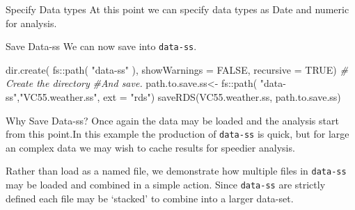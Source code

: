\documentclass[
  ignorenonframetext,
]{beamer}
\newenvironment{Shaded}{\begin{snugshade}}{\end{snugshade}}
\newcommand{\AttributeTok}[1]{\textcolor[rgb]{0.77,0.63,0.00}{#1}}
\newcommand{\CommentTok}[1]{\textcolor[rgb]{0.56,0.35,0.01}{\textit{#1}}}
\newcommand{\ConstantTok}[1]{\textcolor[rgb]{0.00,0.00,0.00}{#1}}
\newcommand{\FunctionTok}[1]{\textcolor[rgb]{0.00,0.00,0.00}{#1}}
\newcommand{\NormalTok}[1]{#1}
\newcommand{\OtherTok}[1]{\textcolor[rgb]{0.56,0.35,0.01}{#1}}
\newcommand{\SpecialCharTok}[1]{\textcolor[rgb]{0.00,0.00,0.00}{#1}}
\newcommand{\StringTok}[1]{\textcolor[rgb]{0.31,0.60,0.02}{#1}}
\begin{document}
\begin{frame}[fragile]{Specify Data types}
\protect\hypertarget{specify-data-types}{}
At this point we can specify data types as Date and numeric for
analysis.

\begin{Shaded}
\end{Shaded}
\end{frame}

\begin{frame}[fragile]{Save Data-ss}
\protect\hypertarget{save-data-ss}{}
We can now save into \texttt{data-ss}.

\begin{Shaded}
\begin{Highlighting}[]
\FunctionTok{dir.create}\NormalTok{( }
\NormalTok{          fs}\SpecialCharTok{::}\FunctionTok{path}\NormalTok{( }
            \StringTok{"data{-}ss"}\NormalTok{ ),  }
            \AttributeTok{showWarnings =} \ConstantTok{FALSE}\NormalTok{,}
            \AttributeTok{recursive =} \ConstantTok{TRUE}\NormalTok{) }\CommentTok{\# Create the directory}
\CommentTok{\#And save.}
\NormalTok{path.to.save.ss}\OtherTok{\textless{}{-}}\NormalTok{ fs}\SpecialCharTok{::}\FunctionTok{path}\NormalTok{( }
                               \StringTok{"data{-}ss"}\NormalTok{,}\StringTok{"VC55.weather.ss"}\NormalTok{,}
                            \AttributeTok{ext =} \StringTok{"rds"}\NormalTok{)}
\FunctionTok{saveRDS}\NormalTok{(VC55.weather.ss, path.to.save.ss)}
\end{Highlighting}
\end{Shaded}
\end{frame}

\begin{frame}[fragile]{Why Save Data-ss?}
\protect\hypertarget{why-save-data-ss}{}
Once again the data may be loaded and the analysis start from this
point.In this example the production of \texttt{data-ss} is quick, but
for large an complex data we may wish to cache results for speedier
analysis.

Rather than load as a named file, we demonstrate how multiple files in
\texttt{data-ss} may be loaded and combined in a simple action. Since
\texttt{data-ss} are strictly defined each file may be `stacked' to
combine into a larger data-set.
\end{frame}
\end{document}
